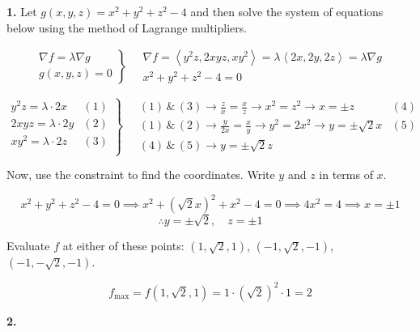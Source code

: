 \documentclass{article}
\begin{document}
\textbf{1.} Let $g(x,y,z)=x^2+y^2+z^2-4$ and then solve the system of equations below using the method of Lagrange multipliers.

\[
\left.
\begin{array}{ll}
\displaystyle\nabla f =\lambda \nabla g \\
\displaystyle g(x,y,z) = 0
\end{array}
\right\}\quad
\begin{array}{ll}
\nabla f = \left\langle y^2z,2xyz,xy^2\right\rangle = \lambda\left\langle2x,2y,2z\right\rangle = \lambda\nabla g \\[0.2cm] x^2+y^2+z^2-4=0
\end{array}
\]

\[
\left.
\begin{array}{ll}
\displaystyle y^2z =\lambda \cdot2x & (1)\\[0.2cm]
\displaystyle 2xyz =\lambda \cdot2y & (2)\\[0.2cm]
\displaystyle xy^2 =\lambda \cdot2z & (3)\\[0.2cm]
\end{array}
\right\}\quad
\begin{array}{ll}
\displaystyle(1)\,\&\,(3)\rightarrow\frac{z}{x}=\frac{x}{z}\rightarrow x^2=z^2\rightarrow x=\pm z&(4)\\[0.4cm]
\displaystyle(1)\,\&\,(2)\rightarrow\frac{y}{2x}=\frac{x}{y}\rightarrow y^2=2x^2\rightarrow y=\pm\sqrt{2}x&(5)\\[0.4cm]\displaystyle(4)\,\&\,(5)\rightarrow y=\pm \sqrt 2z
\end{array}
\]

Now, use the constraint to find the coordinates. Write $y$ and $z$ in terms of $x$.

\[x^2+y^2+z^2-4=0\implies x^2+\left(\sqrt2x\right)^2+x^2-4=0\implies4x^2=4\implies x=\pm1\]
\[\therefore y=\pm\sqrt2,\quad z=\pm1\]

Evaluate $f$ at either of these points: $(1,\sqrt2,1)$, $(-1,\sqrt2,-1)$, $(-1,-\sqrt2,-1)$.

\[f_{\text{max}}=f(1,\sqrt2,1)=1\cdot\left(\sqrt2\right)^2\cdot1=\boxed{2}\]

\vspace{1em}

\textbf{2.}
\end{document}
